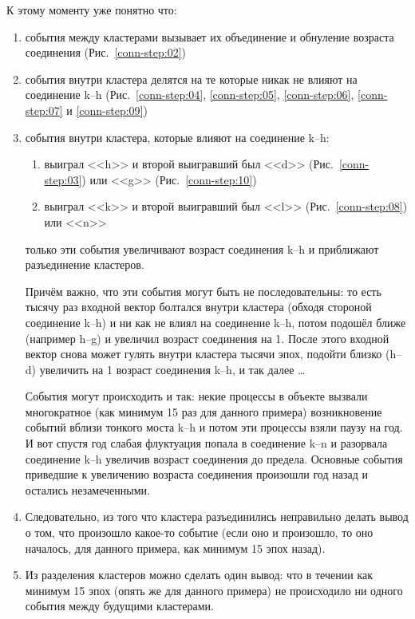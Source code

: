 \documentclass[unicode, 12pt, a4paper,oneside,fleqn]{article}
\begin{document}
\clearpage
К этому моменту уже понятно что:
\begin{enumerate}
\item события между кластерами вызывает их объединение и обнуление
  возраста соединения (Рис.~\ref{conn-step:02})
\item события внутри кластера делятся на те которые никак не влияют
  на соединение k--h (Рис.~\ref{conn-step:04}, \ref{conn-step:05},
  \ref{conn-step:06}, \ref{conn-step:07} и \ref{conn-step:09})
\item события внутри кластера, которые влияют на соединение k--h:
  \begin{enumerate}
  \item выиграл <<h>> и второй выигравший был <<d>>
    (Рис.~\ref{conn-step:03}) или <<g>> (Рис.~\ref{conn-step:10})
  \item выиграл <<k>> и второй выигравший был <<l>>
    (Рис.~\ref{conn-step:08}) или <<n>>
  \end{enumerate}
  только эти события увеличивают возраст соединения k--h и
  приближают разъединение кластеров.
  
  Причём важно, что эти события могут быть не последовательны: то есть
  тысячу раз входной вектор болтался внутри кластера (обходя стороной
  соединение k--h) и ни как не влиял на соединение k--h, потом подошёл
  ближе (например h--g) и увеличил возраст соединения на 1. После
  этого входной вектор снова может гулять внутри кластера тысячи эпох,
  подойти близко (h--d) увеличить на 1 возраст соединения k--h, и так
  далее \ldots

  События могут происходить и так: некие процессы в объекте вызвали
  многократное (как минимум 15 раз для данного примера) возникновение
  событий вблизи тонкого моста k--h и потом эти процессы взяли паузу
  на год. И вот спустя год слабая флуктуация попала в соединение k--n
  и разорвала соединение k--h увеличив возраст соединения до
  предела. Основные события приведшие к увеличению возраста соединения
  произошли год назад и остались незамеченными.

\item Следовательно, из того что кластера разъединились неправильно
  делать вывод о том, что произошло какое-то событие (если оно и
  произошло, то оно началось, для данного примера, как минимум 15 эпох
  назад).
\item Из разделения кластеров можно сделать один вывод: что в течении
  как минимум 15 эпох (опять же для данного примера) не происходило ни
  одного события между будущими кластерами.
\end{enumerate}
\end{document}
